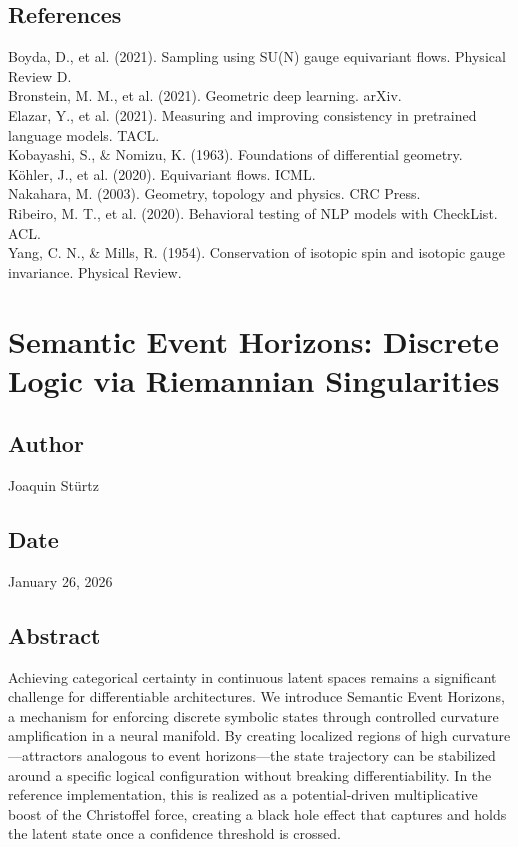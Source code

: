 \documentclass{article}
\numberwithin{equation}{section}
\begin{document}
\subsection*{References}
Boyda, D., et al. (2021). Sampling using SU(N) gauge equivariant flows. Physical Review D.\\
Bronstein, M. M., et al. (2021). Geometric deep learning. arXiv.\\
Elazar, Y., et al. (2021). Measuring and improving consistency in pretrained language models. TACL.\\
Kobayashi, S., \& Nomizu, K. (1963). Foundations of differential geometry.\\
Köhler, J., et al. (2020). Equivariant flows. ICML.\\
Nakahara, M. (2003). Geometry, topology and physics. CRC Press.\\
Ribeiro, M. T., et al. (2020). Behavioral testing of NLP models with CheckList. ACL.\\
Yang, C. N., \& Mills, R. (1954). Conservation of isotopic spin and isotopic gauge invariance. Physical Review.

\section{Semantic Event Horizons: Discrete Logic via Riemannian Singularities}
\subsection*{Author}
Joaquin Stürtz
\subsection*{Date}
January 26, 2026
\subsection*{Abstract}
Achieving categorical certainty in continuous latent spaces remains a significant challenge for differentiable architectures. We introduce Semantic Event Horizons, a mechanism for enforcing discrete symbolic states through controlled curvature amplification in a neural manifold. By creating localized regions of high curvature---attractors analogous to event horizons---the state trajectory can be stabilized around a specific logical configuration without breaking differentiability. In the reference implementation, this is realized as a potential-driven multiplicative boost of the Christoffel force, creating a black hole effect that captures and holds the latent state once a confidence threshold is crossed.
\end{document}

